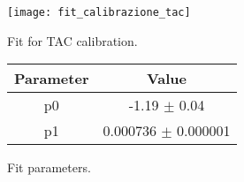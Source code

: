 \begin{figure}[h!]
\begin{minipage}[b]{0.6\textwidth}
\centering
\texttt{[image: fit\_calibrazione\_tac]}
\caption{Fit for TAC calibration.}
\label{fig: fit tac}
\end{minipage}
\hfill
\begin{minipage}[b]{0.45\textwidth}
\centering
\begin{tabular}{cc}
\toprule
\toprule
Parameter & Value \\
\midrule
p0     & -1.19 $\pm$  0.04 \\
p1     &  0.000736   $\pm$  0.000001\\
\bottomrule
\bottomrule
\end{tabular}
\vspace{1.5cm}
\caption*{Fit parameters.}
\end{minipage}

\end{figure}
%

